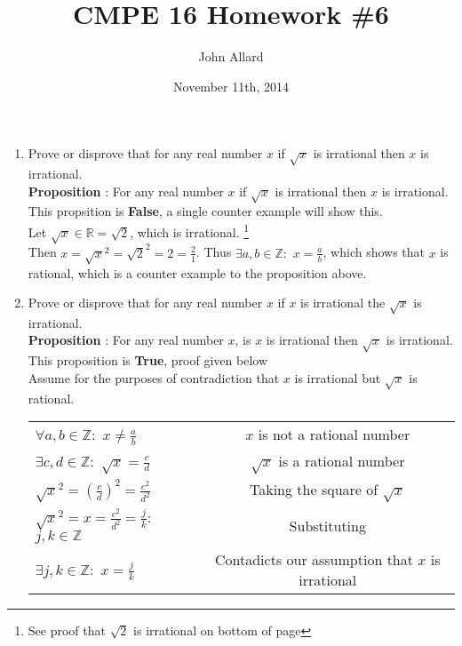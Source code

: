 \documentclass[a4paper,11pt]{article}
\title{ CMPE 16 Homework \#6}
\author{John Allard}
\date{November 11th, 2014}
\begin{document}
\maketitle

\begin{enumerate} 


\item Prove or disprove that for any real number $x$ if $\sqrt{x}$ is irrational then $x$ is irrational. \\
\textbf{Proposition} : For any real number $x$ if $\sqrt{x}$ is irrational then $x$ is irrational.   %
This propsition is \textbf{False}, a single counter example will show this. \\

Let $\sqrt{x} \in \mathbb{R} = \sqrt{2}$, which is irrational. \footnote{See proof that $\sqrt{2}$ is irrational on bottom of page} \\
Then $x = \sqrt{x}^2 = \sqrt{2}^2 = 2 = \frac{2}{1}$.
Thus $\exists a,b \in \mathbb{Z} : $ $x = \frac{a}{b}$, which shows that $x$ is rational, which is a counter example to the proposition above.




\item Prove or disprove that for any real number $x$ if $x$ is irrational the $\sqrt{x}$ is irrational. \\
\textbf{Proposition} : For any real number $x$, is $x$ is irrational then $\sqrt{x}$ is irrational. \\
This proposition is \textbf{True}, proof given below \\

Assume for the purposes of contradiction that $x$ is irrational but $\sqrt{x}$ is rational. \\
\begin{tabular}{l | c}
$\forall a,b \in \mathbb{Z} :$ $x \neq \frac{a}{b}$     & $x$ is not a rational number \\
$\exists c,d \in \mathbb{Z} :$ $\sqrt{x} = \frac{c}{d}$ & $\sqrt{x}$ is a rational number \\
$\sqrt{x}^2 = (\frac{c}{d})^2 = \frac{c^2}{d^2}$          & Taking the square of $\sqrt{x}$ \\
$\sqrt{x}^2 = x = \frac{c^2}{d^2} = \frac{j}{k} : $ $ j,k \in \mathbb{Z}$ & Substituting \\
$\exists j,k \in \mathbb{Z} : $ $x = \frac{j}{k}$         & Contadicts our assumption that $x$ is irrational \\
\end{tabular}


\end{enumerate}
\end{document}
